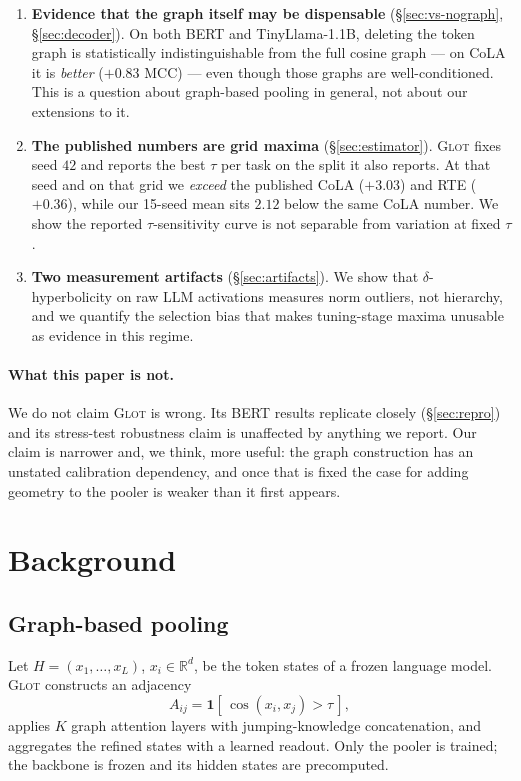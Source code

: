 \documentclass{article} %
\begin{document}
\begin{enumerate}
\item \textbf{Evidence that the graph itself may be dispensable}
      (\S\ref{sec:vs-nograph}, \S\ref{sec:decoder}). On both BERT and
      TinyLlama-1.1B, deleting the token graph is statistically
      indistinguishable from the full cosine graph --- on CoLA it is
      \emph{better} ($+0.83$ MCC) --- even though those graphs are
      well-conditioned. This is a question about graph-based pooling in
      general, not about our extensions to it.
\item \textbf{The published numbers are grid maxima} (\S\ref{sec:estimator}).
      \textsc{Glot} fixes seed $42$ and reports the best $\tau$ per task on the
      split it also reports. At that seed and on that grid we \emph{exceed} the
      published CoLA ($+3.03$) and RTE ($+0.36$), while our 15-seed mean sits
      $2.12$ below the same CoLA number. We show the reported
      $\tau$-sensitivity curve is not separable from variation at fixed $\tau$.
\item \textbf{Two measurement artifacts} (\S\ref{sec:artifacts}). We show that
      $\delta$-hyperbolicity on raw LLM activations measures norm outliers, not
      hierarchy, and we quantify the selection bias that makes tuning-stage
      maxima unusable as evidence in this regime.
\end{enumerate}

\paragraph{What this paper is not.} We do not claim \textsc{Glot} is wrong. Its
BERT results replicate closely (\S\ref{sec:repro}) and its stress-test
robustness claim is unaffected by anything we report. Our claim is narrower and,
we think, more useful: the graph construction has an unstated calibration
dependency, and once that is fixed the case for adding geometry to the pooler
is weaker than it first appears.

\section{Background}
\label{sec:background}

\subsection{Graph-based pooling}
Let $H = (x_1,\dots,x_L)$, $x_i \in \mathbb{R}^d$, be the token states of a
frozen language model. \textsc{Glot} constructs an adjacency
\begin{equation}
A_{ij} = \mathbf{1}\!\left[\, \cos(x_i, x_j) > \tau \,\right],
\label{eq:glot-adj}
\end{equation}
applies $K$ graph attention layers with jumping-knowledge concatenation, and
aggregates the refined states with a learned readout. Only the pooler is
trained; the backbone is frozen and its hidden states are precomputed.
\end{document}
